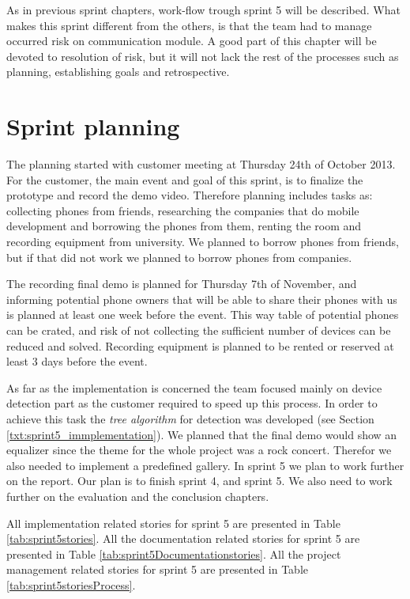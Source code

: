 As in previous sprint chapters, work-flow trough sprint 5 will be described. What makes this sprint different from the others, is that the team had to manage occurred risk on communication module. A good part of this chapter will be devoted to resolution of risk, but it will not lack the rest of the processes such as planning, establishing goals and retrospective.

\section{Sprint planning}

The planning started with customer meeting at Thursday 24th of October 2013. For the customer, the main event and goal of this sprint, is to finalize the prototype and record the demo video. Therefore planning includes tasks as: collecting phones from friends, researching the companies that do mobile development and borrowing the phones from them, renting the room and recording equipment from university. We planned to borrow phones from friends, but if that did not work we planned to borrow phones from companies.

The recording final demo is planned for Thursday 7th of November, and informing potential phone owners that will be able to share their phones with us is planned at least one week before the event. This way table of potential phones can be crated, and risk of not collecting the sufficient number of devices can be reduced and solved. Recording equipment is planned to be rented or reserved at least 3 days before the event.

As far as the implementation is concerned the team focused mainly on device detection part as the customer required to speed up this process. In order to achieve this task the \textit{tree algorithm} for detection was developed (see Section \ref{txt:sprint5_immplementation}). We planned that the final demo would show an equalizer since the theme for the whole project was a rock concert. Therefor we also needed to implement a predefined gallery.
In sprint 5 we plan to work further on the report. Our plan is to finish sprint 4, and sprint 5. We also need to work further on the evaluation and the conclusion chapters.  

All implementation related stories for sprint 5 are presented in Table \ref{tab:sprint5stories}.
 All the documentation related stories for sprint 5 are presented in Table \ref{tab:sprint5Documentationstories}.
 All the project management related stories for sprint 5 are presented in Table \ref{tab:sprint5storiesProcess}.


